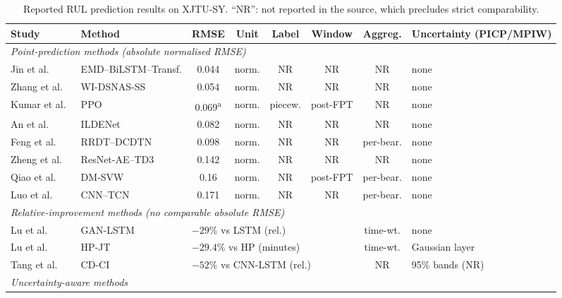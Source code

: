 \documentclass[review]{elsarticle}
\begin{document}
\begin{table}[!htbp]
\centering
\caption{Reported RUL prediction results on XJTU-SY. ``NR'': not
reported in the source, which precludes strict comparability.}
\label{tab:benchmark}
\scriptsize
\renewcommand{\arraystretch}{1.15}
\setlength{\tabcolsep}{3pt}
\begin{tabular}{llcccccl}
\toprule
\textbf{Study} & \textbf{Method} & \textbf{RMSE} & \textbf{Unit} &
\textbf{Label} & \textbf{Window} & \textbf{Aggreg.} &
\textbf{Uncertainty (PICP/MPIW)} \\
\midrule
\multicolumn{8}{l}{\textit{Point-prediction methods (absolute normalised RMSE)}}\\
Jin et al.~\cite{app15179529}        & EMD--BiLSTM--Transf. & 0.044 & norm. & NR & NR & NR & none \\
Zhang et al.~\cite{11682466}         & WI-DSNAS-SS          & 0.054 & norm. & NR & NR & NR & none \\
Kumar et al.~\cite{machines14060672} & PPO                  & 0.069\textsuperscript{a} & norm. & piecew. & post-FPT & NR & none \\
An et al.~\cite{10935355}            & ILDENet              & 0.082 & norm. & NR & NR & NR & none \\
Feng et al.~\cite{FENG2026105865}    & RRDT--DCDTN          & 0.098 & norm. & NR & NR & per-bear. & none \\
Zheng et al.~\cite{10423873}         & ResNet-AE--TD3       & 0.142 & norm. & NR & NR & NR & none \\
Qiao et al.~\cite{QIAO2026112248}    & DM-SVW               & 0.16  & norm. & NR & post-FPT & per-bear. & none \\
Luo et al.~\cite{11637655}           & CNN--TCN             & 0.171 & norm. & NR & NR & per-bear. & none \\
\midrule
\multicolumn{8}{l}{\textit{Relative-improvement methods (no comparable absolute RMSE)}}\\
Lu et al.~\cite{9486650}             & GAN-LSTM             & \multicolumn{4}{l}{$-29\%$ vs LSTM (rel.)}       & time-wt. & none \\
Lu et al.~\cite{lu_joint_2022}       & HP-JT                & \multicolumn{4}{l}{$-29.4\%$ vs HP (minutes)}    & time-wt. & Gaussian layer \\
Tang et al.~\cite{10555355}          & CD-CI                & \multicolumn{4}{l}{$-52\%$ vs CNN-LSTM (rel.)}   & NR & 95\% bands (NR) \\
\midrule
\multicolumn{8}{l}{\textit{Uncertainty-aware methods}}\\

\end{tabular}
\end{table}
\end{document}
